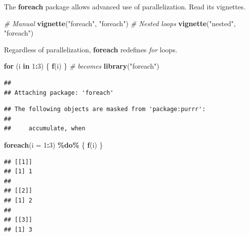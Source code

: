 \documentclass[
  12pt,
  american,
  a4paper,
  extrafontsizes,onecolumn,openright
  ]{memoir}
\newenvironment{Shaded}{\begin{snugshade}}{\end{snugshade}}
\newcommand{\AttributeTok}[1]{\textcolor[rgb]{0.13,0.29,0.53}{#1}}
\newcommand{\CommentTok}[1]{\textcolor[rgb]{0.56,0.35,0.01}{\textit{#1}}}
\newcommand{\ControlFlowTok}[1]{\textcolor[rgb]{0.13,0.29,0.53}{\textbf{#1}}}
\newcommand{\DecValTok}[1]{\textcolor[rgb]{0.00,0.00,0.81}{#1}}
\newcommand{\FunctionTok}[1]{\textcolor[rgb]{0.13,0.29,0.53}{\textbf{#1}}}
\newcommand{\NormalTok}[1]{#1}
\newcommand{\SpecialCharTok}[1]{\textcolor[rgb]{0.81,0.36,0.00}{\textbf{#1}}}
\newcommand{\StringTok}[1]{\textcolor[rgb]{0.31,0.60,0.02}{#1}}
\begin{document}
The \textbf{foreach} package allows advanced use of parallelization.
Read its vignettes.

\scriptsize

\begin{Shaded}
\begin{Highlighting}[]
\CommentTok{\# Manual}
\FunctionTok{vignette}\NormalTok{(}\StringTok{"foreach"}\NormalTok{, }\StringTok{"foreach"}\NormalTok{)}
\CommentTok{\# Nested loops}
\FunctionTok{vignette}\NormalTok{(}\StringTok{"nested"}\NormalTok{, }\StringTok{"foreach"}\NormalTok{)}
\end{Highlighting}
\end{Shaded}

\normalsize

Regardless of parallelization, \textbf{foreach} redefines \emph{for} loops.

\scriptsize

\begin{Shaded}
\begin{Highlighting}[]
\ControlFlowTok{for}\NormalTok{ (i }\ControlFlowTok{in} \DecValTok{1}\SpecialCharTok{:}\DecValTok{3}\NormalTok{) \{}
    \FunctionTok{f}\NormalTok{(i)}
\NormalTok{\}}
\CommentTok{\# becomes}
\FunctionTok{library}\NormalTok{(}\StringTok{"foreach"}\NormalTok{)}
\end{Highlighting}
\end{Shaded}

\begin{verbatim}
## 
## Attaching package: 'foreach'
\end{verbatim}

\begin{verbatim}
## The following objects are masked from 'package:purrr':
## 
##     accumulate, when
\end{verbatim}

\begin{Shaded}
\begin{Highlighting}[]
\FunctionTok{foreach}\NormalTok{(}\AttributeTok{i =} \DecValTok{1}\SpecialCharTok{:}\DecValTok{3}\NormalTok{) }\SpecialCharTok{\%do\%}\NormalTok{ \{}
    \FunctionTok{f}\NormalTok{(i)}
\NormalTok{\}}
\end{Highlighting}
\end{Shaded}

\begin{verbatim}
## [[1]]
## [1] 1
## 
## [[2]]
## [1] 2
## 
## [[3]]
## [1] 3
\end{verbatim}

\normalsize
\end{document}
